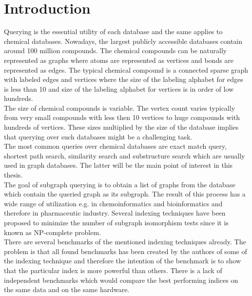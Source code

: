 \chapter*{Introduction}

Querying is the essential utility of each database and the same applies to chemical databases. Nowadays, the largest publicly accessible databases contain around 100 million compounds. The chemical compounds can be naturally represented as graphs where atoms are represented as vertices and bonds are represented as edges. The typical chemical compound is a connected sparse graph with labeled edges and vertices where the size of the labeling alphabet for edges is less than 10 and size of the labeling alphabet for vertices is in order of low hundreds.\\

The size of chemical compounds is variable. The vertex count varies typically from very small compounds with less then 10 vertices to huge compounds with hundreds of vertices. These sizes multiplied by the size of the database implies that querying over such databases might be a challenging task.\\

The most common queries over chemical databases are exact match query, shortest path search, similarity search and substructure search which are usually used in graph databases. The latter will be the main point of interest in this thesis.\\

The goal of subgraph querying is to obtain a list of graphs from the database which contain the queried graph as its subgraph. The result of this process has a wide range of utilization e.g. in chemoinformatics and bioinformatics and therefore in pharmaceutic industry. Several indexing techniques have been proposed to minimize the number of subgraph isomorphism tests since it is known as NP-complete problem.\\

There are several benchmarks of the mentioned indexing techniques already. The problem is that all found benchmarks has been created by the authors of some of the indexing technique and therefore the intention of the benchmark is to show that the particular index is more powerful than others. There is a lack of independent benchmarks which would compare the best performing indices on the same data and on the same hardware.\\  

